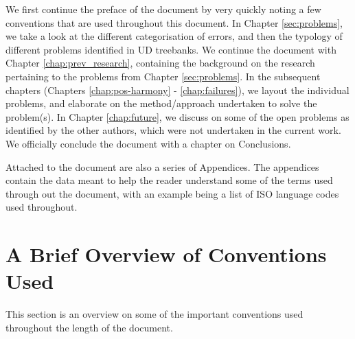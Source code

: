 We first continue the preface of the document by very quickly noting a few conventions that are used throughout this document. In Chapter \ref{sec:problems}, we take a look at the different categorisation of errors, and then the typology of different problems identified in UD treebanks. We continue the document with Chapter \ref{chap:prev_research}, containing the background on the research pertaining to the problems from Chapter \ref{sec:problems}. In the subsequent chapters (Chapters \ref{chap:pos-harmony} - \ref{chap:failures}), we layout the individual problems, and elaborate on the method/approach undertaken to solve the problem(s). In Chapter \ref{chap:future}, we discuss on some of the open problems as identified by the other authors, which were not undertaken in the current work. We officially conclude the document with a chapter on Conclusions.

Attached to the document are also a series of Appendices. The appendices contain the data meant to help the reader understand some of the terms used through out the document, with an example being a list of ISO language codes used throughout.

\section{A Brief Overview of Conventions Used}
\label{conventions}

This section is an overview on some of the important conventions used throughout the length of the document.

